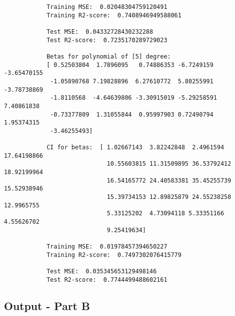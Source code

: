\begin{verbatim}
            Training MSE:  0.02048304759120491
            Training R2-score:  0.7408946949588061
            
            Test MSE:  0.04332728430232288
            Test R2-score:  0.7235170289729023
            
            Betas for polynomial of [5] degree:  
            [ 0.52503804  1.7896095   0.74886353 -6.7249159  -3.65470155 
             -1.05890768 7.19828896  6.27610772  5.80255991 -3.78738869 
             -1.8110568  -4.64639806 -3.30915019 -5.29258591  7.40861838 
             -0.73377809  1.31055844  0.95997903 0.72490794  1.95374315 
             -3.46255493]
             
            CI for betas:  [ 1.02667143  3.82242848  2.4961594  17.64198866 
                             10.55603815 11.31509895 36.53792412 18.92199964 
                             16.54165772 24.40583381 35.45255739 15.52938946
                             15.39734153 12.89825879 24.55238258 12.9965755   
                             5.33125202  4.73094118 5.33351166  4.55626702  
                             9.25419634]
                             
            Training MSE:  0.01978457394650227
            Training R2-score:  0.7497302076415779
            
            Test MSE:  0.035345653129498146
            Test R2-score:  0.7744499488602161
\end{verbatim}

\subsection{Output - Part B}
\label{chap:Output - Part B}

